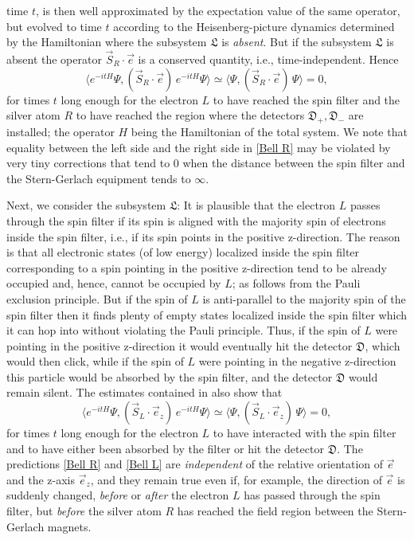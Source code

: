 \documentclass[a4paper,11pt]{article}
\begin{document}
time $t$, is then well approximated by the expectation value of the same operator, but evolved to time $t$ according to the 
Heisenberg-picture dynamics determined by the Hamiltonian where the subsystem $\mathfrak{L}$ is \textit{absent}. 
But if the subsystem $\mathfrak{L}$ is absent the operator $\vec{S}_{R}\cdot \vec{e}$ is a conserved quantity, i.e., 
time-independent. Hence 
\begin{equation}\label{Bell R}
\langle e^{-itH} \Psi, (\vec{S}_{R}\cdot \vec{e})\, e^{-itH} \Psi \rangle \simeq \langle \Psi, (\vec{S}_{R}\cdot \vec{e})\, 
\Psi \rangle = 0,
\end{equation}
for times $t$ long enough for the electron $L$ to have reached the spin filter and the silver atom $R$ to have reached
the region where the detectors $\mathfrak{D}_{+}, \mathfrak{D}_{-}$ are installed; the operator $H$ being the 
Hamiltonian of the total system. We note that equality between the left side and the right side in \eqref{Bell R} 
may be violated by very tiny corrections that tend to 0 when the distance between the spin filter and the 
Stern-Gerlach equipment tends to $\infty$.

Next, we consider the subsystem $\mathfrak{L}$: It is plausible that the electron $L$ passes through the spin filter
 if its spin is aligned with the majority spin of electrons inside the spin filter, i.e., if its spin points in the positive z-direction. 
 The reason is that all electronic states (of low energy) localized inside the spin filter corresponding to a spin pointing in 
 the positive z-direction tend to be already occupied and, hence, cannot be occupied by $L$; as follows from the Pauli 
 exclusion principle. But if the spin of $L$ is anti-parallel to the majority spin of the spin filter then it finds plenty of empty 
 states localized inside the spin filter which it can hop into without violating the Pauli principle.
Thus, if the spin of $L$ were pointing in the positive z-direction it would eventually hit the detector $\mathfrak{D}$, which 
would then click, while if the spin of $L$ were pointing in the negative z-direction this particle would be absorbed by 
the spin filter, and the detector $\mathfrak{D}$ would remain silent.
The estimates contained in \cite{FFS} also show that 
\begin{equation}\label{Bell L}
\langle e^{-itH} \Psi, (\vec{S}_{L}\cdot \vec{e}_z)\, e^{-itH} \Psi \rangle \simeq \langle \Psi, (\vec{S}_{L}\cdot \vec{e}_z)\, 
\Psi \rangle = 0,
\end{equation}
for times $t$ long enough for the electron $L$ to have interacted with the spin filter and to have either been absorbed 
by the filter or hit the detector $\mathfrak{D}$. The predictions \eqref{Bell R} and \eqref{Bell L} are \textit{independent} 
of the relative orientation of $\vec{e}$  and the z-axis $\vec{e}_z$, and they remain true even if, for example, the direction of
$\vec{e}$ is suddenly changed, \textit{before} or \textit{after} the electron $L$ has passed through the spin filter, but 
\textit{before} the silver atom $R$ has reached the field region between the Stern-Gerlach magnets.
\end{document}
